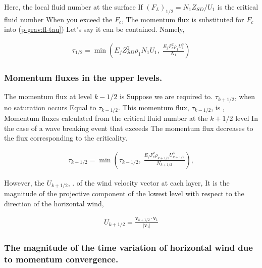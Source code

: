 Here, the local fluid number at the surface If
\((F_L)_{1/2} = N_1 Z_{SD}/U_1\) is the critical fluid number When you
exceed the \(F_c\), The momentum flux is substituted for \(F_c\) into
(\protect\hyperlink{p-grav:fl-tau}{p-grav:fl-tau{]}}) Let's say it can
be contained. Namely,

\begin{eqnarray}
  \tau_{1/2} = \min \left(
                   E_f Z_{SD}^{2} \rho_1 N_1 U_1, \; 
                  \frac{E_f F_c^{2} \rho_1 U_1^3}{N_1}
               \right)
\end{eqnarray}

\hypertarget{momentum-fluxes-in-the-upper-levels.}{%
\subsubsection{Momentum fluxes in the upper
levels.}\label{momentum-fluxes-in-the-upper-levels.}}

The momentum flux at level \(k-1/2\) is Suppose we are required to.
\(\tau_{k+1/2}\), when no saturation occurs Equal to \(\tau_{k-1/2}\).
This momentum flux, \(\tau_{k-1/2}\), is , Momentum fluxes calculated
from the critical fluid number at the \(k+1/2\) level In the case of a
wave breaking event that exceeds The momentum flux decreases to the flux
corresponding to the criticality.

\begin{eqnarray}
  \tau_{k+1/2} = \min \left( 
               \tau_{k-1/2}, \;
               \frac{E_f F_c^2 \rho_{k+1/2} U_{k+1/2}^3}{N_{k+1/2}}
                      \right),
\end{eqnarray}

However, the \(U_{k+1/2}\), . of the wind velocity vector at each layer,
It is the magnitude of the projective component of the lowest level with
respect to the direction of the horizontal wind,

\begin{eqnarray}
  U_{k+1/2} = \frac{{\mathbf v}_{k+1/2} 
                      \cdot {\mathbf v}_{1}}
                   {|{\mathbf v}_{1}|       }
\end{eqnarray}

\hypertarget{the-magnitude-of-the-time-variation-of-horizontal-wind-due-to-momentum-convergence.}{%
\subsubsection{The magnitude of the time variation of horizontal wind
due to momentum
convergence.}\label{the-magnitude-of-the-time-variation-of-horizontal-wind-due-to-momentum-convergence.}}

